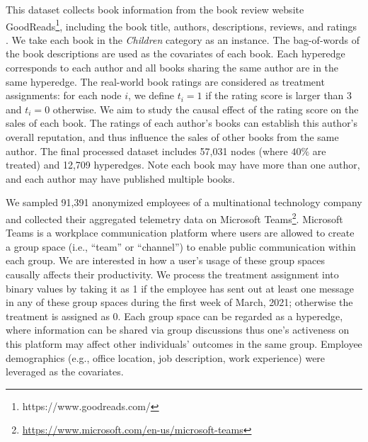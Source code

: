  This dataset collects book information from the book review website GoodReads\footnote{https://www.goodreads.com/}, including the book title, authors, descriptions, reviews, and ratings \cite{wan2018item,wan2019fine}. We take each book in the \textit{Children} category as an instance. The bag-of-words of the book descriptions are used as the covariates of each book. %
Each hyperedge corresponds to each author and all books sharing the same author are in the same hyperedge.
The real-world book ratings are considered as treatment assignments: for each node $i$, we define $t_i=1$ if the rating score is larger than 3 and $t_i=0$ otherwise. We aim to study the causal effect of the rating score on the sales of each book. The ratings of each author's books can establish this author's overall reputation, and thus influence the sales of other books from the same author. The final processed dataset includes 57,031 nodes (where $40\%$ are treated) and 12,709 hyperedges. Note each book may have more than one author, and each author may have published multiple books.

 We sampled 91,391 anonymized employees of a multinational technology company and collected their aggregated telemetry data on Microsoft Teams\footnote{\href{https://www.microsoft.com/en-us/microsoft-teams}{https://www.microsoft.com/en-us/microsoft-teams}}. Microsoft Teams is a workplace communication platform where users are allowed to create a group space (i.e., ``team'' or ``channel'') to enable public communication within each group. We are interested in how a user's usage of these group spaces causally affects their productivity. We process the treatment assignment into binary values by taking it as 1 if the employee has sent out at least one message in any of these group spaces during the first week of March, 2021; otherwise the treatment is assigned as 0. Each group space can be regarded as a hyperedge, where information can be shared via group discussions thus one's activeness on this platform may affect other individuals' outcomes in the same group. Employee demographics (e.g., office location, job description, work experience) were leveraged as the covariates. 


